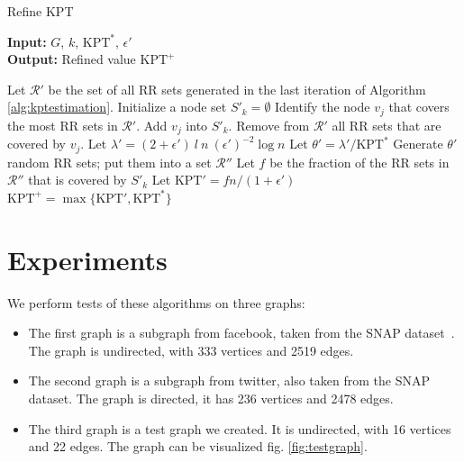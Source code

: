 \documentclass[a4paper,12pt]{article}
\begin{document}
\begin{algorithm}
\caption{Refine KPT}\label{alg:kptrefinement}
\hspace*{\algorithmicindent} \textbf{Input: } $G$, $k$, $\text{KPT}^*$, $\epsilon'$\\
\hspace*{\algorithmicindent} \textbf{Output: } Refined value $\text{KPT}^+$
\begin{algorithmic}[1]
\State Let $\mathcal{R}'$ be the set of all RR sets generated in the last iteration of Algorithm \ref{alg:kptestimation}.
\State Initialize a node set $S'_k = \emptyset$
\State Identify the node $v_j$ that covers the most RR sets in $\mathcal{R}'$.
\State Add $v_j$ into $S'_k$.
\State Remove from $\mathcal{R}'$ all RR sets that are covered by $v_j$.
\EndFor
\State Let $\lambda' = (2+\epsilon') \ l \ n \ (\epsilon')^{-2} \log n$
\State Let $\theta' = \lambda' / \text{KPT}^*$
\State Generate $\theta'$ random RR sets; put them into a set $\mathcal{R}''$
\State Let $f$ be the fraction of the RR sets in $\mathcal{R}''$ that is covered by $S'_k$
\State Let $\text{KPT}' = fn/(1+\epsilon')$
\State\Return $\text{KPT}^+ = \max\{\text{KPT}', \text{KPT}^*\}$
\end{algorithmic}
\end{algorithm}


\section{Experiments}
\label{scn:exp}

We perform tests of these algorithms on three graphs:
\begin{itemize}
 \item The first graph is a subgraph from facebook, taken from the SNAP dataset~\cite{leskovec2015snap}. The graph is undirected, with 333 vertices and 2519 edges.
\item The second graph is a subgraph from twitter, also taken from the SNAP dataset. The graph is directed, it has 236 vertices and 2478 edges.
\item The third graph is a test graph we created. It is undirected, with 16 vertices and 22 edges. The graph can be visualized fig. \ref{fig:testgraph}.
 \end{itemize}
 
\end{document}
